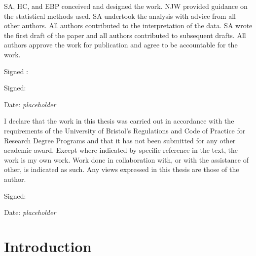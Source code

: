 \documentclass[11pt,twoside]{bristolthesis}
\begin{document}
\begin{contribution}
      SA, HC, and EBP conceived and designed the work. NJW provided guidance on the statistical methods used. SA undertook the analysis with advice from all other authors. All authors contributed to the interpretation of the data. SA wrote the first draft of the paper and all authors contributed to subsequent drafts. All authors approve the work for publication and agree to be accountable for the work.
      
      \par
      
      Signed :
      
      \par
      
      Signed:
      
      \par
      
      Date: \emph{placeholder}
    \end{contribution}
      \begin{declaration}
      I declare that the work in this thesis was carried out in accordance with the requirements of the University of Bristol's Regulations and Code of Practice for Research Degree Programs and that it has not been submitted for any other academic award. Except where indicated by specific reference in the text, the work is my own work. Work done in collaboration with, or with the assistance of other, is indicated as such. Any views expressed in this thesis are those of the author.
      
      \par
      
      Signed:
      
      \par
      
      Date: \emph{placeholder}
    \end{declaration}
      \hypersetup{linkcolor=black}
    \setcounter{tocdepth}{2}
    \tableofcontents
  
      \listoftables
  
      \listoffigures
  


  \mainmatter %
  \pagestyle{fancyplain} %

  \hypertarget{introduction}{%
  \chapter{Introduction}\label{introduction}}
  
\end{document}
